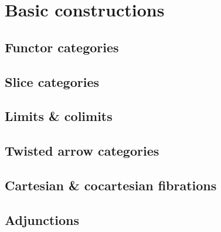 
\section{Basic constructions \inc}%
\label{sec:Basicconstructions}

\subsection{Functor categories \inc}%
\label{sub:Functorcategories}

\subsection{Slice categories \inc}%
\label{sub:Slicecategories}

\subsection{Limits \& colimits \inc}%
\label{sub:Limitscolimits}

\subsection{Twisted arrow categories \inc}%
\label{sub:Twistedarrowcategories}

\subsection{Cartesian \& cocartesian fibrations \inc}%
\label{sub:Cartesiancocartesianfibrations}

\subsection{Adjunctions \inc}%
\label{sub:Adjunctions}


